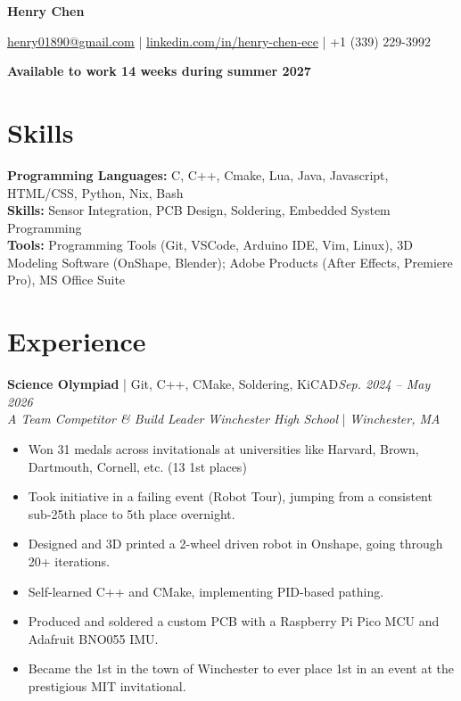 \documentclass[11pt]{article}       %
\begin{document}
\centerline{\Huge \textbf{Henry Chen}}

\vspace{5pt}

\centerline{\href{mailto:henry01890@gmail.com}{\underline{henry01890@gmail.com}} | \href{linkedin.com/in/henry-chen-ece}{\underline{linkedin.com/in/henry-chen-ece}} | +1 (339) 229-3992}
\centerline{\textbf{Available to work 14 weeks during summer 2027}}

\vspace{-14pt}

\section*{Skills}
\vspace{3pt}
\textbf{Programming Languages:} C, C++, Cmake, Lua, Java, Javascript, HTML/CSS, Python, Nix, Bash   \\
\textbf{Skills:} Sensor Integration, PCB Design, Soldering, Embedded System Programming\\
\textbf{Tools:} Programming Tools (Git, VSCode, Arduino IDE, Vim, Linux), 3D Modeling Software (OnShape, Blender); Adobe Products (After Effects, Premiere Pro), MS Office Suite

\vspace{-8pt}



\section*{Experience}
\vspace{3pt}
\textbf{Science Olympiad} | Git, C++, CMake, Soldering, KiCAD\hfill \textit{Sep. 2024 – May 2026}\\
\vspace{-1pt}
\textit{A Team Competitor \& Build Leader}    \hfill \textit{Winchester High School} | \textit{Winchester, MA}\\
\vspace{-5pt}
\begin{itemize}
  \item Won 31 medals across invitationals at universities like Harvard, Brown, Dartmouth, Cornell, etc. (13 1st places)
  \item Took initiative in a failing event (Robot Tour), jumping from a consistent sub-25th place to 5th place overnight.
  \item Designed and 3D printed a 2-wheel driven robot in Onshape, going through 20+ iterations.
  \item Self-learned C++ and CMake, implementing PID-based pathing.
  \item Produced and soldered a custom PCB with a Raspberry Pi Pico MCU and Adafruit BNO055 IMU.
  \item Became the 1st in the town of Winchester to ever place 1st in an event at the prestigious MIT invitational.
\end{itemize}
\end{document}
